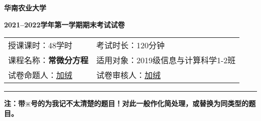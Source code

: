 \documentclass{ctexart}
\begin{document}
	\begin{center}
		\textbf{\LARGE 华南农业大学}\par
		\vspace{8pt}
		\textbf{\LARGE 2021--2022学年第一学期期末考试试卷}
	\end{center}
	
	\begin{center}
		\begin{tabular}{m{} m{} m{}}
			授课课时：48学时 &考试时长：120分钟\\
			课程名称：\textbf{常微分方程} 
			& \multicolumn{2}{l}{适用对象：2019级信息与计算科学1-2班}\\
			试卷命题人：\underline{加绒}
			&试卷审核人：\underline{加绒}
		\end{tabular}
	\end{center}
	\hrule height 2pt
	\vspace{0.5cm}
	\textbf{注：带$\divideontimes$号的为我记不太清楚的题目！对此一般作化简处理，或替换为同类型的题目。}
\end{document}
